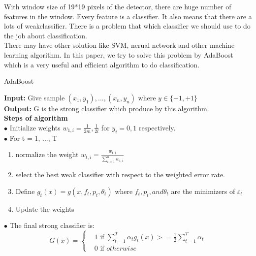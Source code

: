\documentclass[a4paper, 11pt]{article} %
\begin{document}
    With window size of 19*19 pixels of the detector, there are huge number of features in the window. Every feature is a classifier. It also means that there are a lots of weakclassifier. There is a problem that which classifier we should use to do the job about classification. \\

    There may have other solution like SVM, nerual network and other machine learning algorithm. In this paper, we try to solve this problem by AdaBoost which is a very useful and efficient algorithm to do classification.

    \begin{algorithm}
        \caption{AdaBoost}

        \textbf{Input:} Give sample $(x_{1}, y_{1}), ..., (x_{n},y_{n})$ where $y \in \{-1, +1\}$\\

        \textbf{Output:} G is the strong classifier which produce by this algorithm.\\

        \textbf{Steps of algorithm}\\

        $\bullet$ Initialize weights $w_{1,i} = \tfrac{1}{2m}, \tfrac{1}{2l}$ for $y_{i} = 0, 1$ respectively.\\

        $\bullet$ For t = 1, ..., T
                \begin{enumerate}
                    \item normalize the weight $w_{t, i} = \tfrac{w_{t, i}}{\sum_{i = 1}^{n} w_{t, i}}$
                    \item select the best weak classifier with respect to the weighted error rate.
                    \item Define $g_{t}(x) = g(x, f_{t}, p_{t}, \theta_{t})$ where $f_{t}, p_{t}, and \theta_{t}$ are the minimizers of $\varepsilon_{t}$

                    \item Update the weights
                \end{enumerate}

        $\bullet$ The final strong classifier is:\\
            \begin{equation}
            G(x) = 
            \begin{cases}
                & \text{1 if } \sum_{t = 1}^{T} \alpha_{t} g_{t} (x) >= \tfrac{1}{2} \sum_{t = 1}^{T} \alpha_{t}\\
                & \text{0 if } otherwise
            \end{cases}
            \end{equation}
    \end{algorithm}
\end{document}
